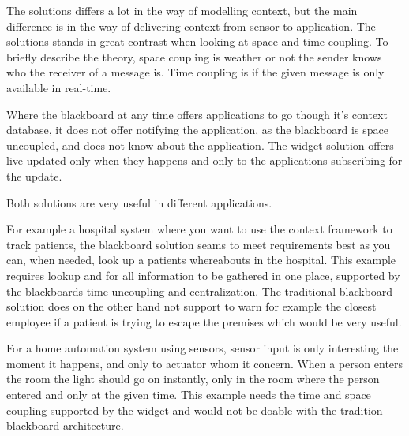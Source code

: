\documentclass[../report.tex]{subfiles}
\begin{document}
The solutions differs a lot in the way of modelling context, but the main difference is in the way of delivering context from sensor to application. The solutions stands in great contrast when looking at space and time coupling. To briefly describe the theory, space coupling is weather or not the sender knows who the receiver of a message is. Time coupling is if the given message is only available in real-time. 

Where the blackboard at any time offers applications to go though it's context database, it does not offer notifying the application, as the blackboard is space uncoupled, and does not know about the application. The widget solution offers live updated only when they happens and only to the applications subscribing for the update.

Both solutions are very useful in different applications.

For example a hospital system where you want to use the context framework to track patients, the blackboard solution seams to meet requirements best as you can, when needed, look up a patients whereabouts in the hospital.
This example requires lookup and for all information to be gathered in one place, supported by the blackboards time uncoupling and centralization. The traditional blackboard solution does on the other hand not support to warn for example the closest employee if a patient is trying to escape the premises which would be very useful.

For a home automation system using sensors, sensor input is only interesting the moment it happens, and only to actuator whom it concern. When a person enters the room the light should go on instantly, only in the room where the person entered and only at the given time. This example needs the time and space coupling supported by the widget and would not be doable with the tradition blackboard architecture.
\end{document}

